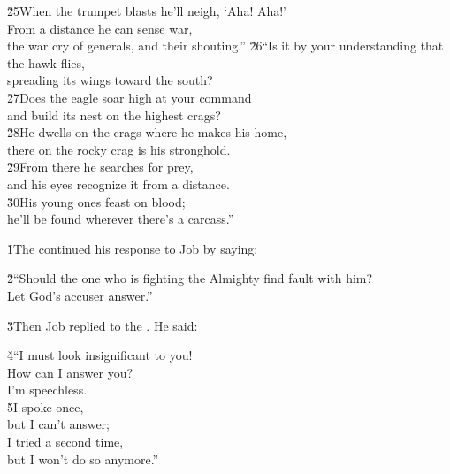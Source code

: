 \begin{poetry}
\poeml \v{25}When the trumpet blasts he'll neigh, `Aha! Aha!' \\
\poemll    From a distance he can sense war, \\
\poemlll       the war cry of generals, and their shouting.''
\poeml \v{26}``Is it by your understanding that the hawk flies, \\
\poemll    spreading its wings toward the south? \\
\poeml \v{27}Does the eagle soar high at your command \\
\poemll    and build its nest on the highest crags? \\
\poeml \v{28}He dwells on the crags where he makes his home, \\
\poemll    there on the rocky crag is his stronghold. \\
\poeml \v{29}From there he searches for prey, \\
\poemll    and his eyes recognize it from a distance. \\
\poeml \v{30}His young ones feast on blood; \\
\poemll    he'll be found wherever there's a carcass.''
\end{poetry}

\v{1}The  continued his response to Job by saying:

\begin{poetry}
\poeml \v{2}``Should the one who is fighting the Almighty find fault with him? \\
\poemll    Let God's accuser answer.''
\end{poetry}

\v{3}Then Job replied to the . He said:

\begin{poetry}
\poeml \v{4}``I must look insignificant to you! \\
\poemll    How can I answer you? \\
\poemlll       I'm speechless. \\
\poeml \v{5}I spoke once, \\
\poemll    but I can't answer; \\
\poeml I tried a second time, \\
\poemll    but I won't do so anymore.''
\end{poetry}

